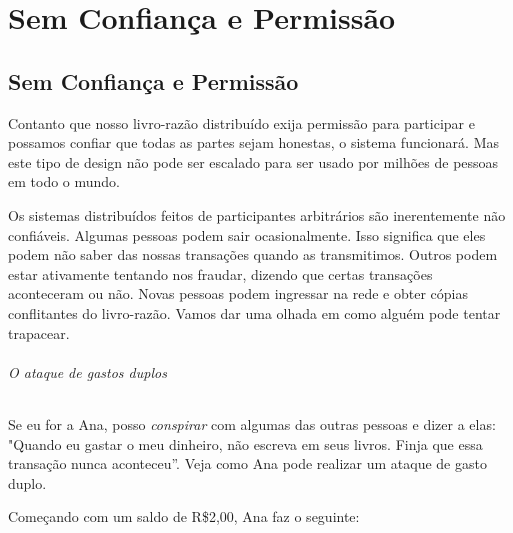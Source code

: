 \part{Sem Confiança e Permissão}
\label{ch:capitulo3}
\chapter*{Sem Confiança e Permissão}

Contanto que nosso livro-razão distribuído exija permissão para participar e possamos confiar que todas as partes sejam honestas, o sistema funcionará. Mas este tipo de design não pode ser escalado para ser usado por milhões de pessoas em todo o mundo.

Os sistemas distribuídos feitos de participantes arbitrários são inerentemente não confiáveis. Algumas pessoas podem sair ocasionalmente. Isso significa que eles podem não saber das nossas transações quando as transmitimos. Outros podem estar ativamente tentando nos fraudar, dizendo que certas transações aconteceram ou não. Novas pessoas podem ingressar na rede e obter cópias conflitantes do livro-razão. Vamos dar uma olhada em como alguém pode tentar trapacear.

\paragraph{O ataque de gastos duplos}
\paragraph{}

Se eu for a Ana, posso \textit{conspirar} com algumas das outras pessoas e dizer a elas: "Quando eu gastar o meu dinheiro, não escreva em seus livros. Finja que essa transação nunca aconteceu”. Veja como Ana pode realizar um ataque de gasto duplo.

Começando com um saldo de R\$2,00, Ana faz o seguinte:

